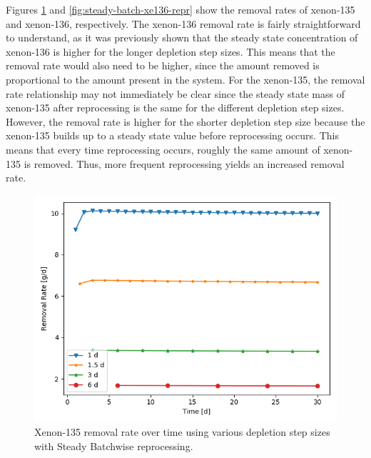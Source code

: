 Figures \ref{fig:steady-batch-xe135-repr} and \ref{fig:steady-batch-xe136-repr} show the removal rates of xenon-135 and xenon-136, respectively. The xenon-136 removal rate is fairly straightforward to understand, as it was previously shown that the steady state concentration of xenon-136 is higher for the longer depletion step sizes. This means that the removal rate would also need to be higher, since the amount removed is proportional to the amount present in the system. For the xenon-135, the removal rate relationship may not immediately be clear since the steady state mass of xenon-135 after reprocessing is the same for the different depletion step sizes. However, the removal rate is higher for the shorter depletion step size because the xenon-135 builds up to a steady state value before reprocessing occurs. This means that every time reprocessing occurs, roughly the same amount of xenon-135 is removed. Thus, more frequent reprocessing yields an increased removal rate.

\begin{figure}[H]
  \centering
  \includegraphics[scale=0.7]{images/waste_Xe135_6d_sp_comp.png}
  \caption{Xenon-135 removal rate over time using various depletion step sizes with Steady Batchwise reprocessing.}
   \label{fig:steady-batch-xe135-repr}
\end{figure}


